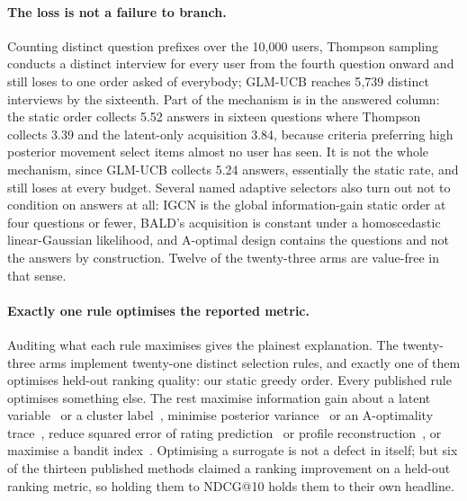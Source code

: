 \documentclass[runningheads]{llncs}
\begin{document}
\paragraph{The loss is not a failure to branch.}
Counting distinct question prefixes over the 10{,}000 users, Thompson sampling conducts a distinct
interview for every user from the fourth question onward and still loses to one order asked of
everybody; GLM-UCB reaches 5{,}739 distinct interviews by the sixteenth. Part of the mechanism is in
the answered column: the static order collects 5.52 answers in sixteen questions where Thompson
collects 3.39 and the latent-only acquisition 3.84, because criteria preferring high posterior
movement select items almost no user has seen. It is not the whole mechanism, since GLM-UCB collects
5.24 answers, essentially the static rate, and still loses at every budget. Several named adaptive
selectors also turn out not to condition on answers at all: IGCN is the global information-gain
static order at four questions or fewer, BALD's acquisition is constant under a homoscedastic
linear-Gaussian likelihood, and A-optimal design contains the questions and not the answers by
construction. Twelve of the twenty-three arms are value-free in that sense.

\paragraph{Exactly one rule optimises the reported metric.}
Auditing what each rule maximises gives the plainest explanation. The twenty-three arms implement
twenty-one distinct selection rules, and exactly one of them optimises held-out ranking quality: our
static greedy order. Every published rule optimises something else. The
rest maximise information gain about a latent variable~\cite{ma2019eddi} or a cluster
label~\cite{rashid2008learning}, minimise posterior variance~\cite{houlsby2011bald} or an
A-optimality trace~\cite{anava2015budget,sepliarskaia2018spq}, reduce squared error of rating
prediction~\cite{golbandi2011adaptive,zhou2011functional} or profile
reconstruction~\cite{kweon2020deep,proissl2024greedyslim}, or maximise a bandit
index~\cite{zhao2013interactive,zhang2020conucb,wang2023conlinucb,liu2025clisk,parapar2021dpe}.
Optimising a surrogate is not a defect in itself; but six of the thirteen published methods claimed
a ranking improvement on a held-out ranking metric, so holding them to NDCG@10 holds them to their
own headline.
\end{document}
